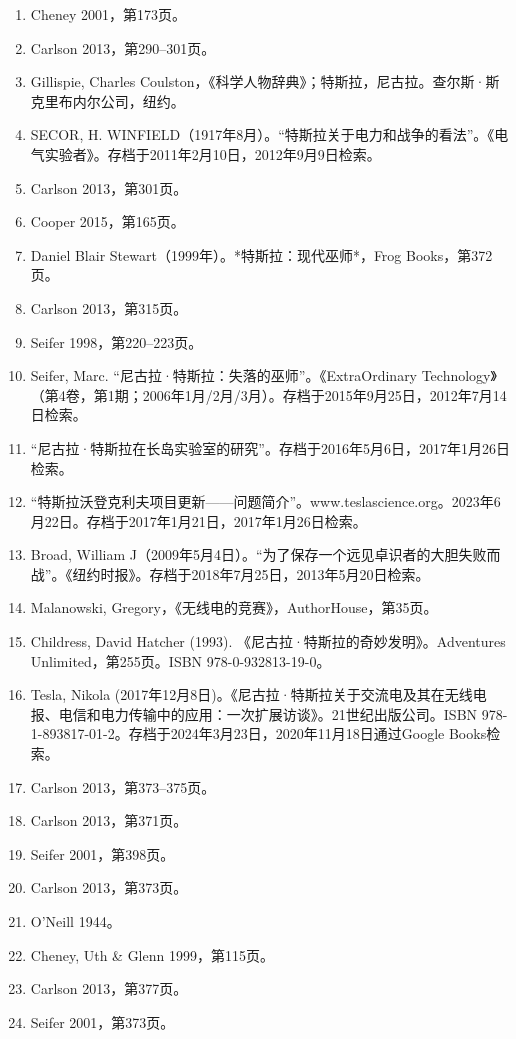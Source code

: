 \begin{enumerate}
\item Cheney 2001，第173页。  
\item Carlson 2013，第290–301页。  
\item Gillispie, Charles Coulston，《科学人物辞典》；特斯拉，尼古拉。查尔斯·斯克里布内尔公司，纽约。  
\item SECOR, H. WINFIELD（1917年8月）。“特斯拉关于电力和战争的看法”。《电气实验者》。存档于2011年2月10日，2012年9月9日检索。  
\item Carlson 2013，第301页。  
\item Cooper 2015，第165页。  
\item Daniel Blair Stewart（1999年）。*特斯拉：现代巫师*，Frog Books，第372页。
\item Carlson 2013，第315页。  
\item Seifer 1998，第220–223页。  
\item Seifer, Marc. “尼古拉·特斯拉：失落的巫师”。《ExtraOrdinary Technology》（第4卷，第1期；2006年1月/2月/3月）。存档于2015年9月25日，2012年7月14日检索。  
\item “尼古拉·特斯拉在长岛实验室的研究”。存档于2016年5月6日，2017年1月26日检索。  
\item “特斯拉沃登克利夫项目更新——问题简介”。www.teslascience.org。2023年6月22日。存档于2017年1月21日，2017年1月26日检索。  
\item Broad, William J（2009年5月4日）。“为了保存一个远见卓识者的大胆失败而战”。《纽约时报》。存档于2018年7月25日，2013年5月20日检索。  
\item Malanowski, Gregory，《无线电的竞赛》，AuthorHouse，第35页。
\item Childress, David Hatcher (1993). 《尼古拉·特斯拉的奇妙发明》。Adventures Unlimited，第255页。ISBN 978-0-932813-19-0。  
\item Tesla, Nikola (2017年12月8日)。《尼古拉·特斯拉关于交流电及其在无线电报、电信和电力传输中的应用：一次扩展访谈》。21世纪出版公司。ISBN 978-1-893817-01-2。存档于2024年3月23日，2020年11月18日通过Google Books检索。  
\item Carlson 2013，第373–375页。  
\item Carlson 2013，第371页。  
\item Seifer 2001，第398页。  
\item Carlson 2013，第373页。  
\item O'Neill 1944。  
\item Cheney, Uth & Glenn 1999，第115页。  
\item Carlson 2013，第377页。  
\item Seifer 2001，第373页。

\end{enumerate}
